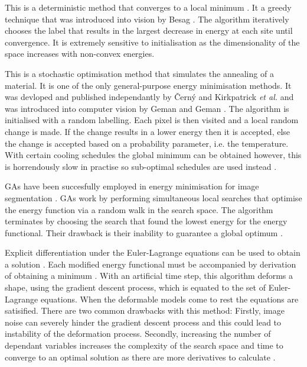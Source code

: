 \begin{definition}
	This is a deterministic method that converges to a local minimum \citep{Cassisa2010}.
	It a greedy technique that was introduced into vision by Besag \citep{Besag1986,Veksler1999}.
	The algorithm iteratively chooses the label that results in the largest decrease in energy at each site until convergence.
	It is extremely sensitive to initialisation as the dimensionality of the space increases with non-convex energies.
\end{definition}
 
\begin{definition}
	This is a stochastic optimisation method that simulates the annealing of a material.
	It is one of the only general-purpose energy minimisation methods.
	It was devloped and published independantly by \v{C}ern{\'y} \citep{Cerny1985} and Kirkpatrick \textit{et al.} \citep{Kirkpatrick1983} and was introduced into computer vision by Geman and Geman \citep{Geman1984}.
	The algorithm is initialised with a random labelling.
	Each pixel is then visited and a local random change is made.
	If the change results in a lower energy then it is accepted, else the change is accepted based on a probability parameter, i.e. the temperature.
	With certain cooling schedules the global minimum can be obtained however, this is horrendously slow in practise so sub-optimal schedules are used instead \citep{Geman1984}.
\end{definition}

\begin{definition}
 	GAs have been succesfully employed in energy minimisation for image segmentation \citep{MacEachern1998,Ballerini1999,Ballerini2001,Zeipelt2001,Ibanez2009}.
 	GAs work by performing simultaneous local searches that optimise the energy function via a random walk in the search space.
 	The algorithm terminates by choosing the search that found the lowest energy for the energy functional.
 	Their drawback is their inability to guarantee a global optimum \citep{McIntosh2013}.
\end{definition}

\begin{definition}
	Explicit differentiation under the Euler-Lagrange equations can be used to obtain a solution \citep{McIntosh2013}.
	Each modified energy functional must be accompanied by derivation of obtaining a minimum \citep{Terzopoulos1987,Kass1988,Caselles1997,Chan2001}.
	With an artificial time step, this algorithm deforms a shape, using the gradient descent process, which is equated to the set of Euler-Lagrange equations.
	When the deformable models come to rest the equations are satisified.
	There are two common drawbacks with this method: Firstly, image noise can severely hinder the gradient descent process and this could lead to instability of the  deformation process.
	Secondly, increasing the number of dependant variables increases the complexity of the search space and time to converge to an optimal solution as there are more derivatives to calculate \citep{McIntosh2013}.
\end{definition}

